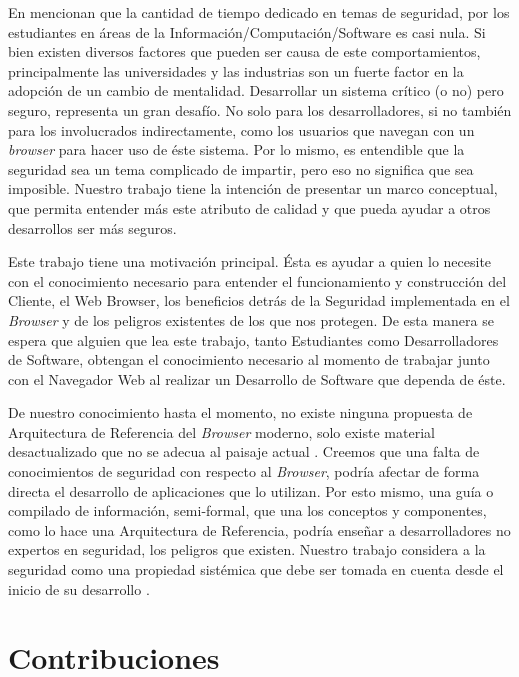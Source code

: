 En \cite{goertzel2007software, WhyteHarrison} mencionan que la cantidad de tiempo dedicado en temas de seguridad, por los estudiantes en áreas de la Información/Computación/Software es casi nula. Si bien existen diversos factores \cite{WhyteHarrison} que pueden ser causa de este comportamientos, principalmente las universidades y las industrias son un fuerte factor en la adopción de un cambio de mentalidad. Desarrollar un sistema crítico (o no) pero seguro, representa un gran desafío. No solo para los desarrolladores, si no también para los involucrados indirectamente, como los usuarios que navegan con un \textit{browser} para hacer uso de éste sistema. Por lo mismo, es entendible que la seguridad sea un tema complicado de impartir, pero eso no significa que sea imposible. Nuestro trabajo tiene la intención de presentar un marco conceptual, que permita entender más este atributo de calidad y que pueda ayudar a otros desarrollos ser más seguros.

Este trabajo tiene una motivación principal. Ésta es ayudar a quien lo necesite con el conocimiento necesario para entender el funcionamiento y construcción del Cliente, el Web Browser, los beneficios detrás de la Seguridad implementada en el \textit{Browser} y de los peligros existentes de los que nos protegen. De esta manera se espera que alguien que lea este trabajo, tanto Estudiantes como Desarrolladores de Software, obtengan el conocimiento necesario al momento de trabajar junto con el Navegador Web al realizar un Desarrollo de Software que dependa de éste.

De nuestro conocimiento hasta el momento, no existe ninguna propuesta de Arquitectura de Referencia del \textit{Browser} moderno, solo existe material desactualizado que no se adecua al paisaje actual \cite{2005-grosskurth-browser-refarch}. Creemos que una falta de conocimientos de seguridad con respecto al \textit{Browser}, podría afectar de forma directa el desarrollo de aplicaciones que lo utilizan. Por esto mismo, una guía o compilado de información, semi-formal, que una los conceptos y componentes, como lo hace una Arquitectura de Referencia, podría enseñar a desarrolladores no expertos en seguridad, los peligros que existen. Nuestro trabajo considera a la seguridad como una propiedad sistémica que debe ser tomada en cuenta desde el inicio de su desarrollo \cite{fernandez2004methodology, fernandez2006defining, braz2008eliciting, fernandez2013security, Fernandez2011}.


\section{Contribuciones}
\label{chap1:contr}

